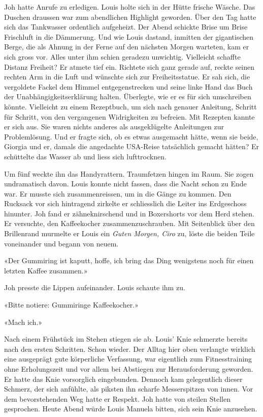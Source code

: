 Joh hatte Anrufe zu erledigen. Louis holte sich in der Hütte frische Wäsche. 
Das Duschen draussen war zum abendlichen Highlight geworden. Über den Tag hatte sich das Tankwasser ordentlich aufgeheizt.
Der Abend schickte Brise um Brise Frischluft in die Dämmerung. Und wie
Louis dastand, inmitten der gigantischen Berge, die als Ahnung in der
Ferne auf den nächsten Morgen warteten, kam er sich gross vor. Alles
unter ihm schien geradezu unwichtig. Vielleicht schaffte Distanz
Freiheit? Er atmete tief ein. Richtete sich ganz gerade auf, reckte
seinen rechten Arm in die Luft und wünschte sich zur Freiheitsstatue.
Er sah sich, die vergoldete Fackel dem Himmel entgegenstrecken und seine
linke Hand das Buch der Unabhängigkeitserklärung halten. Überlegte, wie
er es für sich umschreiben könnte. Vielleicht zu einem Rezeptbuch, um
sich nach genauer Anleitung, Schritt für Schritt, von den vergangenen
Widrigkeiten zu befreien. Mit Rezepten kannte er sich aus. Sie waren
nichts anderes als ausgeklügelte Anleitungen zur Problemlösung. Und er
fragte sich, ob es etwas ausgemacht hätte, wenn sie beide, Giorgia und
er, damals die angedachte USA-Reise tatsächlich gemacht hätten?
Er schüttelte das Wasser ab und liess sich lufttrocknen.

\sectionbreak

Um fünf weckte ihn das Handyrattern. Traumfetzen hingen im Raum. Sie zogen undramatisch davon. 
Louis konnte nicht fassen, dass die Nacht schon zu
Ende war. Er musste sich zusammenreissen, um in die Gänge zu kommen.
Den Rucksack vor sich hintragend zirkelte er schliesslich die Leiter ins
Erdgeschoss hinunter. Joh fand er zähneknirschend und in Boxershorts vor
dem Herd stehen. Er versuchte, den Kaffeekocher zusammenzuschrauben.
Mit Seitenblick über den Brillenrand murmelte er Louis 
ein \emph{Guten Morgen, Ciro} zu, löste die beiden Teile voneinander und
begann von neuem.

«Der Gummiring ist kaputt, hoffe, ich bring das Ding wenigstens noch für
einen letzten Kaffee zusammen.»

Joh presste die Lippen aufeinander. Louis schaute ihm zu.

«Bitte notiere: Gummiringe Kaffeekocher.»

«Mach ich.»

Nach einem Frühstück im Stehen stiegen sie ab. Louis’ Knie
schmerzte bereits nach den ersten Schritten. Schon wieder. Der Alltag
hier oben verlangte wirklich eine ausgeprägt gute körperliche Verfassung, war
eigentlich zum Fitnesstraining ohne Erholungszeit und vor allem bei
Abstiegen zur Herausforderung geworden. Er hatte das Knie vorsorglich
eingebunden. Dennoch kam gelegentlich dieser Schmerz, der sich anfühlte,
als piksten ihn scharfe Messerspitzen von innen. Vor dem bevorstehenden
Weg hatte er Respekt. Joh hatte von steilen Stellen gesprochen.
Heute Abend würde Louis Manuela bitten, sich sein Knie anzusehen.

